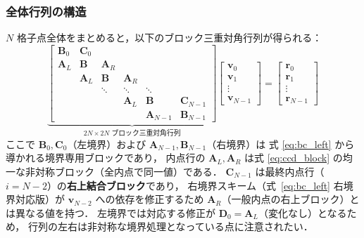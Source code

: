 \subsubsection{全体行列の構造}

$N$ 格子点全体をまとめると，以下のブロック三重対角行列が得られる：
\begin{equation}
  \underbrace{
  \begin{bmatrix}
    \mathbf{B}_0 & \mathbf{C}_0 & & & \\
    \mathbf{A}_L & \mathbf{B} & \mathbf{A}_R & & \\
    & \mathbf{A}_L & \mathbf{B} & \mathbf{A}_R & \\
    & & \ddots & \ddots & \ddots \\
    & & & \mathbf{A}_L & \mathbf{B} & \mathbf{C}_{N-1} \\
    & & & & \mathbf{A}_{N-1} & \mathbf{B}_{N-1}
  \end{bmatrix}
  }_{\text{$2N \times 2N$ ブロック三重対角行列}}
  \begin{bmatrix} \bm{v}_0 \\ \bm{v}_1 \\ \vdots \\ \bm{v}_{N-1} \end{bmatrix}
  =
  \begin{bmatrix} \mathbf{r}_0 \\ \mathbf{r}_1 \\ \vdots \\ \mathbf{r}_{N-1} \end{bmatrix}
  \label{eq:ccd_global}
\end{equation}
ここで $\mathbf{B}_0, \mathbf{C}_0$（左境界）および $\mathbf{A}_{N-1}, \mathbf{B}_{N-1}$（右境界）は
式 \eqref{eq:bc_left} から導かれる境界専用ブロックであり，
内点行の $\mathbf{A}_L, \mathbf{A}_R$ は式 \eqref{eq:ccd_block} の均一な非対称ブロック（全内点で同一値）である．
$\mathbf{C}_{N-1}$ は最終内点行（$i=N-2$）の\textbf{右上結合ブロック}であり，
右境界スキーム（式~\eqref{eq:bc_left} 右境界対応版）が $\bm{v}_{N-2}$ への依存を修正するため
$\mathbf{A}_R$（一般内点の右上ブロック）とは異なる値を持つ．
左境界では対応する修正が $\mathbf{D}_0 = \mathbf{A}_L$（変化なし）となるため，
行列の左右は非対称な境界処理となっている点に注意されたい．

